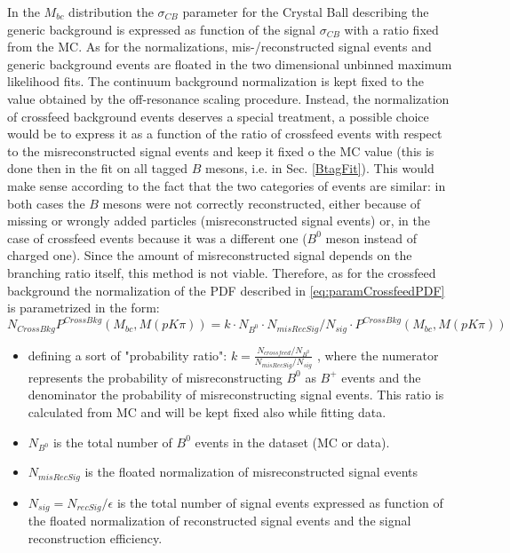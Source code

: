 In the $M_{bc}$ distribution the $\sigma_{CB}$ parameter for the Crystal Ball describing the generic background is expressed as function of the signal $\sigma_{CB}$  with a ratio fixed from the MC. 
\noindent As for the normalizations, mis-/reconstructed signal events and generic background events are floated in the two dimensional unbinned maximum likelihood fits. 
The continuum background normalization is kept fixed to the value obtained by the off-resonance scaling procedure.  Instead, the normalization of crossfeed background events deserves a special treatment, 
a possible choice would be to express it as a function of the ratio of crossfeed events with respect to the misreconstructed signal events and keep it fixed o the MC value
(this is done then in the fit on all tagged $B$ mesons, i.e. in Sec. \ref{BtagFit}). This would make sense according to the fact that the two categories of events are similar: 
in both cases the $B$ mesons were not correctly reconstructed, either because of missing or wrongly added particles (misreconstructed signal events) or, in the case
of crossfeed events because it was a different one ($B^0$ meson instead of charged one). Since the amount of misreconstructed signal depends on the branching ratio itself, 
this method is not viable. 
Therefore, as for the crossfeed background the normalization of the PDF described in \cref{eq:paramCrossfeedPDF} is parametrized in the form:
\begin{equation}
N_{CrossBkg} P^{CrossBkg}(M_{bc}, M(p K \pi)) = k \cdot N_{B^0} \cdot N_{misRecSig} / N_{sig} \cdot  P^{CrossBkg}(M_{bc}, M(p K \pi)) 
\label{eq:paramCrossfeedNorm}
\end{equation}
\begin{itemize}
\item defining a sort of "probability ratio": $k = \frac{N_{crossfeed }/  N_{B^0}}{N_{misRecSig} /  N_{sig} }$ , where the numerator represents the probability of misreconstructing $B^0$ as $B^+$ events
and the denominator the probability of misreconstructing signal events. This ratio is calculated from MC and will be kept fixed also while fitting data. \\
\item  $N_{B^0} $ is the total number of $B^0$ events in the dataset (MC or data). 
\item $N_{misRecSig}$ is the floated normalization of misreconstructed signal events
\item $ N_{sig}  =  N_{recSig} / \epsilon$ is the total number of signal events expressed as function of the floated normalization of reconstructed signal events and the signal reconstruction efficiency. 
\end{itemize}



